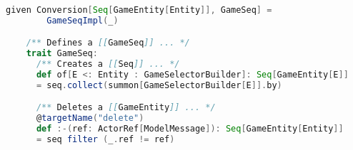 \begin{lstlisting}[language=Scala, label=code:gamedata, caption=Parte del GameSeq.]
    given Conversion[Seq[GameEntity[Entity]], GameSeq] = 
        GameSeqImpl(_)

    /** Defines a [[GameSeq]] ... */
    trait GameSeq:
      /** Creates a [[Seq]] ... */
      def of[E <: Entity : GameSelectorBuilder]: Seq[GameEntity[E]] 
      = seq.collect(summon[GameSelectorBuilder[E]].by)

      /** Deletes a [[GameEntity]] ... */
      @targetName("delete")
      def :-(ref: ActorRef[ModelMessage]): Seq[GameEntity[Entity]] 
      = seq filter (_.ref != ref)
\end{lstlisting}